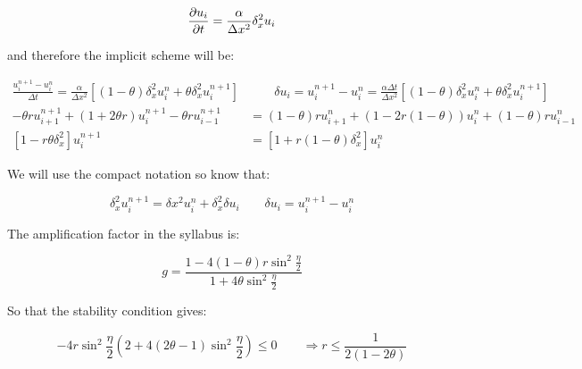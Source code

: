 \begin{equation}
\frac{\partial u_i}{\partial t} = \frac{\alpha}{\Delta x^2} \delta^2 _xu_i
\end{equation}

and therefore the implicit scheme will be: 

\begin{equation}
\begin{aligned}
\frac{u_i^{n+1}-u_i^{n}}{\Delta t} = \frac{\alpha}{\Delta x^2} \left[(1-\theta)\delta _x^2u_i^n + \theta \delta _x^2 u_i^{n+1} \right]& \qquad \delta u_i = u_i^{n+1} -u_i^n = \frac{\alpha \Delta t}{\Delta x^2}\left[(1-\theta)\delta _x^2u_i^n + \theta \delta _x^2 u_i^{n+1} \right] \\
-\theta r u^{n+1}_{i+1} + (1+2\theta r) u^{n+1}_{i} - \theta r u^{n+1}_{i-1} &= (1-\theta)ru^{n}_{i+1} + (1-2r(1-\theta))u^{n}_{i} + (1-\theta) ru^{n}_{i-1} \\
[1-r\theta \delta _x^2] u_i^{n+1} &= [1+r(1-\theta)\delta_x^2]u_i^n
\end{aligned}
\end{equation}

We will use the compact notation so know that:

\begin{equation}
\delta _x^2 u^{n+1}_{i} = \delta x^2u^{n}_{i} + \delta _x^2 \delta u_i \qquad \delta u_i = u^{n+1}_{i}-u^{n}_{i}
\end{equation}



The amplification factor in the syllabus is: 

\begin{equation}
g = \frac{1-4(1-\theta) r\sin ^2\frac{\eta}{2}}{1+4\theta \sin ^2\frac{\eta}{2}}
\end{equation}

So that the stability condition gives: 

\begin{equation}
-4r\sin ^2 \frac{\eta}{2} \left(2+4(2\theta -1)\sin ^2 \frac{\eta }{2}\right)\leq 0 \qquad \Rightarrow r \leq \frac{1}{2(1-2\theta)}
\end{equation}

